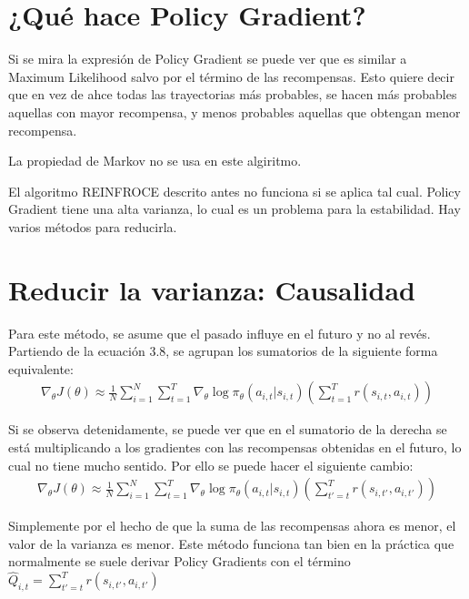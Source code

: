 \section{¿Qué hace Policy Gradient?}%
\label{sec:_qué_hace_policy_gradient_}

Si se mira la expresión de Policy Gradient se puede ver que es similar a Maximum Likelihood
salvo por el término de las recompensas. Esto quiere decir que en vez de ahce todas las
trayectorias más probables, se hacen más probables aquellas con mayor recompensa, y menos
probables aquellas que obtengan menor recompensa.

La propiedad de Markov no se usa en este algiritmo.

El algoritmo REINFROCE descrito antes no funciona si se aplica tal cual. Policy Gradient
tiene una alta varianza, lo cual es un problema para la estabilidad. Hay varios métodos para
reducirla.

\section{Reducir la varianza: Causalidad}%
\label{sec:reducir_la_varianza_causalidad}

Para este método, se asume que el pasado influye en el futuro y no al revés. Partiendo de la
ecuación 3.8, se agrupan los sumatorios de la siguiente forma equivalente:
\begin{align}
\nabla _ { \theta } J ( \theta ) \approx \frac { 1 } { N } \sum _ { i = 1 } ^ { N } \sum _ { t =
1 } ^ { T } \nabla _ { \theta } \operatorname { log } \pi _ { \theta } ( a _ { i , t } | s _ { i
, t } ) \left( \sum _ { t = 1 } ^ { T } r ( s _ { i , t } , a _ { i , t } ) \right)
\end{align}

Si se observa detenidamente, se puede ver que en el sumatorio de la derecha se está
multiplicando a los gradientes con las recompensas obtenidas en el futuro, lo cual no tiene
mucho sentido. Por ello se puede hacer el siguiente cambio:
\begin{align}
    \nabla _ { \theta } J ( \theta ) \approx \frac { 1 } { N } \sum _ { i = 1 } ^ { N } \sum _ { t
        = 1 } ^ { T } \nabla _ { \theta } \operatorname { log } \pi _ { \theta } ( a _ { i , t } | s _ {
    i , t } ) \left( \sum _ { t' = t } ^ { T } r ( s _ { i , t' } , a _ { i , t' } ) \right)
\end{align}

Simplemente por el hecho de que la suma de las recompensas ahora es menor, el valor de la
varianza es menor. Este método funciona tan bien en la práctica que normalmente se suele
derivar Policy Gradients con el término $\hat{Q}_{i,t} =  \sum _ { t' = t } ^ { T } r ( s _ { i , t' } , a _ { i , t' } )$

